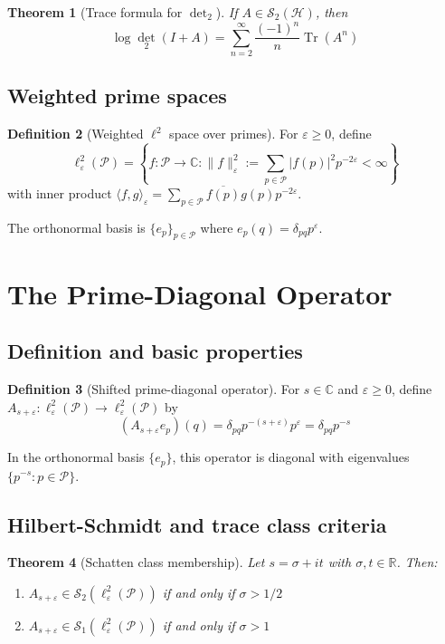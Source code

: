 \documentclass[11pt,a4paper]{article}
\newtheorem{theorem}{Theorem}[section]
\theoremstyle{definition}
\newtheorem{definition}[theorem]{Definition}
\theoremstyle{remark}
\newcommand{\C}{\mathbb{C}}
\newcommand{\R}{\mathbb{R}}
\newcommand{\calP}{\mathcal{P}}
\newcommand{\calS}{\mathcal{S}}
\newcommand{\calH}{\mathcal{H}}
\DeclareMathOperator{\Tr}{Tr}
\DeclareMathOperator{\det}{det}
\begin{document}
\begin{theorem}[Trace formula for $\det_2$]
If $A \in \calS_2(\calH)$, then
\[
\log \det_2(I + A) = \sum_{n=2}^\infty \frac{(-1)^n}{n} \Tr(A^n)
\]
\end{theorem}

\subsection{Weighted prime spaces}

\begin{definition}[Weighted $\ell^2$ space over primes]
For $\varepsilon \geq 0$, define
\[
\ell^2_\varepsilon(\calP) = \left\{ f: \calP \to \C : \|f\|_\varepsilon^2 := \sum_{p \in \calP} |f(p)|^2 p^{-2\varepsilon} < \infty \right\}
\]
with inner product $\langle f, g \rangle_\varepsilon = \sum_{p \in \calP} \overline{f(p)} g(p) p^{-2\varepsilon}$.
\end{definition}

The orthonormal basis is $\{e_p\}_{p \in \calP}$ where $e_p(q) = \delta_{pq} p^\varepsilon$.

\section{The Prime-Diagonal Operator}\label{sec:operator}

\subsection{Definition and basic properties}

\begin{definition}[Shifted prime-diagonal operator]
For $s \in \C$ and $\varepsilon \geq 0$, define $A_{s+\varepsilon}: \ell^2_\varepsilon(\calP) \to \ell^2_\varepsilon(\calP)$ by
\[
(A_{s+\varepsilon} e_p)(q) = \delta_{pq} p^{-(s+\varepsilon)} p^\varepsilon = \delta_{pq} p^{-s}
\]
\end{definition}

In the orthonormal basis $\{e_p\}$, this operator is diagonal with eigenvalues $\{p^{-s} : p \in \calP\}$.

\subsection{Hilbert-Schmidt and trace class criteria}

\begin{theorem}[Schatten class membership]\label{thm:schatten}
Let $s = \sigma + it$ with $\sigma, t \in \R$. Then:
\begin{enumerate}
\item[(a)] $A_{s+\varepsilon} \in \calS_2(\ell^2_\varepsilon(\calP))$ if and only if $\sigma > 1/2$
\item[(b)] $A_{s+\varepsilon} \in \calS_1(\ell^2_\varepsilon(\calP))$ if and only if $\sigma > 1$
\end{enumerate}
\end{theorem}
\end{document}
